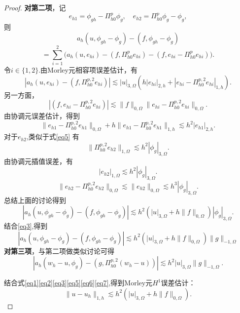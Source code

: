 \documentclass[12pt,a4paper]{article}
\begin{document}
\begin{enumerate}
\begin{proof}
			\textbf{对第二项}，记
			$$e_{h1}=\phi_{gh}-\Pi_{h0}^p\phi_g,\quad e_{h2}=\Pi_{h0}^p\phi_g-\phi_g,$$
			则
			$$a_h(u,\phi_{gh}-\phi_g)-(f,\phi_{gh}-\phi_g)$$
			$$=\sum_{i=1}^2\Big(a_h(u,e_{hi})-(f,\Pi_{h0}^pe_{hi})-(f,e_{hi}-\Pi_{h0}^pe_{hi})\Big).$$
			令$i\in\{1,2\}.$由Morley元相容项误差估计，有
			$$\left|a_h(u,e_{hi})-(f,\Pi_{h0}^{p,2}e_{hi})\right|\lesssim|u|_{3,\Omega}\left(h|e_{hi}|_{2,h}+|e_{hi}-\Pi_{h0}^{p,2}e_{hi}|_{1,h}\right).$$
			另一方面，
			$$|(f,e_{hi}-\Pi_{h0}^{p,2}e_{hi})|\lesssim\|f\|_{0,\Omega}\|e_{hi}-\Pi_{h0}^{p,2}e_{hi}\|_{0,\Omega}.$$
			由协调元误差估计，得到
			$$\|e_{h1}-\Pi_{h0}^{p,2}e_{h1}\|_{0,\Omega}+h\|e_{h1}-\Pi_{h0}^{p,2}e_{h1}\|_{1,h}\lesssim h^2|e_{h1}|_{2,h}.$$
			对于$e_{h2}$,类似于式\eqref{eq5} 有
			$$\|\Pi_{h0}^{p,2}e_{h2}\|_{1,\Omega}\lesssim h^2|\phi_g|_{3,\Omega}.$$
			由协调元插值误差，有
			$$|e_{h2}|_{1,\Omega}\lesssim h^2|\phi_g|_{3,\Omega}.$$
			$$\|e_{h2}-\Pi_{h0}^{p,2}e_{h2}\|_{0,\Omega}\lesssim\|e_{h2}\|_{0,\Omega}\lesssim h^3|\phi_g|_{3,\Omega}.$$
			总结上面的讨论得到
			$$|a_h(u,\phi_{gh}-\phi_g)-(f,\phi_{gh}-\phi_g)|\lesssim h^2(|u|_{3,\Omega}+h\|f\|_{0,\Omega})|\phi_g|_{3,\Omega}.$$
			结合\eqref{eq3},得到
			\begin{equation}\label{eq6}
				|a_h(u,\phi_{gh}-\phi_g)-(f,\phi_{gh}-\phi_g)|\lesssim h^2(|u|_{3,\Omega}+h\|f\|_{0,\Omega})\|g\|_{-1,\Omega}
			\end{equation}
			\textbf{对第三项}，与第二项做类似讨论可得
			\begin{equation}\label{eq7}
				|a_h(w_h-u,\phi_g)-(g,\Pi_{h0}^{p,2}(w_h-u))|\lesssim h^2|u|_{3,\Omega}\|g\|_{-1,\Omega}.
			\end{equation}
			
			结合式\eqref{eq1}\eqref{eq2}\eqref{eq3}\eqref{eq5}\eqref{eq6}\eqref{eq7},得到Morley元$H^1$误差估计：
			$$
			\|u-u_h\|_{1,h}\lesssim h^2\left(|u|_{3,\Omega}+h\|f\|_{0,\Omega}\right).
			$$
		\end{proof}
	\end{enumerate}
	
	
\end{document}
